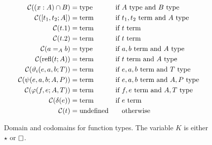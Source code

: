 \begin{figure}
    \centering
    \begin{align*}
        \mathcal{C}((x : A) \cap B) &=\!\! \ptype &\text{if }& A\ptype \text{ and } B\ptype \\
        \mathcal{C}([t_1, t_2; A]) &=\!\! \pterm &\text{if }& t_1, t_2\pterm \text{ and } A\ptype \\
        \mathcal{C}(t.1) &=\!\! \pterm &\text{if }& t\pterm \\
        \mathcal{C}(t.2) &=\!\! \pterm &\text{if }& t\pterm \\
        \mathcal{C}(a =_A b) &=\!\! \ptype &\text{if }& a, b\pterm \text{ and } A\ptype \\
        \mathcal{C}(\prefl(t; A)) &=\!\! \pterm &\text{if }& t\pterm \text{ and } A\ptype \\
        \mathcal{C}(\vartheta_i(e, a, b; T)) &=\!\! \pterm &\text{if }& e, a, b\pterm \text{ and } T\ptype \\
        \mathcal{C}(\psi(e, a, b; A, P)) &=\!\! \pterm &\text{if }& e, a, b\pterm \text{ and } A, P\ptype \\
        \mathcal{C}(\varphi(f, e; A, T)) &=\!\! \pterm &\text{if }& f, e\pterm \text{ and } A, T\ptype \\
        \mathcal{C}(\delta(e)) &=\!\! \pterm &\text{if }& e\pterm \\
        \mathcal{C}(t) &= \text{undefined} &&\text{otherwise}
    \end{align*}
    \caption{Domain and codomains for function types. The variable $K$ is either $\star$ or $\kind$.}
\end{figure}

